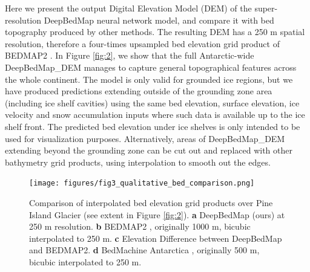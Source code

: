 \documentclass[tc, manuscript]{copernicus}
\begin{document}
Here we present the output Digital Elevation Model (DEM) of the super-resolution DeepBedMap neural network model, and compare it with bed topography produced by other methods.
The resulting DEM has a 250 m spatial resolution, therefore a four-times upsampled bed elevation grid product of BEDMAP2 \citep{FretwellBedmap2improvedice2013}.
In Figure \ref{fig:2}, we show that the full Antarctic-wide DeepBedMap\_DEM manages to capture general topographical features across the whole continent.
The model is only valid for grounded ice regions, but we have produced predictions extending outside of the grounding zone area (including ice shelf cavities) using the same bed elevation, surface elevation, ice velocity and snow accumulation inputs where such data is available up to the ice shelf front.
The predicted bed elevation under ice shelves is only intended to be used for visualization purposes.
Alternatively, areas of DeepBedMap\_DEM extending beyond the grounding zone can be cut out and replaced with other bathymetry grid products, using interpolation to smooth out the edges.

\begin{figure}[htbp]
  \texttt{[image: figures/fig3\_qualitative\_bed\_comparison.png]}
  \caption{
    Comparison of interpolated bed elevation grid products over Pine Island Glacier (see extent in Figure \ref{fig:2}).
    \textbf{a} DeepBedMap (ours) at 250 m resolution.
    \textbf{b} BEDMAP2 \citep{FretwellBedmap2improvedice2013}, originally 1000 m, bicubic interpolated to 250 m.
    \textbf{c} Elevation Difference between DeepBedMap and BEDMAP2.
    \textbf{d} BedMachine Antarctica \citep{MorlighemMEaSUREsBedMachineAntarctica2019}, originally 500 m, bicubic interpolated to 250 m.
  }
  \label{fig:3}
\end{figure}
\end{document}
